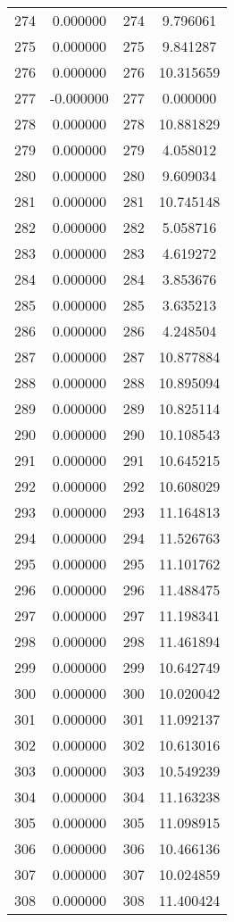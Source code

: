 \documentclass[12pt]{article}
\begin{document}
\begin{longtable}{@{}cccc@{}}
274 & 0.000000 & 274 & 9.796061 \\
275 & 0.000000 & 275 & 9.841287 \\
276 & 0.000000 & 276 & 10.315659 \\
277 & -0.000000 & 277 & 0.000000 \\
278 & 0.000000 & 278 & 10.881829 \\
279 & 0.000000 & 279 & 4.058012 \\
280 & 0.000000 & 280 & 9.609034 \\
281 & 0.000000 & 281 & 10.745148 \\
282 & 0.000000 & 282 & 5.058716 \\
283 & 0.000000 & 283 & 4.619272 \\
284 & 0.000000 & 284 & 3.853676 \\
285 & 0.000000 & 285 & 3.635213 \\
286 & 0.000000 & 286 & 4.248504 \\
287 & 0.000000 & 287 & 10.877884 \\
288 & 0.000000 & 288 & 10.895094 \\
289 & 0.000000 & 289 & 10.825114 \\
290 & 0.000000 & 290 & 10.108543 \\
291 & 0.000000 & 291 & 10.645215 \\
292 & 0.000000 & 292 & 10.608029 \\
293 & 0.000000 & 293 & 11.164813 \\
294 & 0.000000 & 294 & 11.526763 \\
295 & 0.000000 & 295 & 11.101762 \\
296 & 0.000000 & 296 & 11.488475 \\
297 & 0.000000 & 297 & 11.198341 \\
298 & 0.000000 & 298 & 11.461894 \\
299 & 0.000000 & 299 & 10.642749 \\
300 & 0.000000 & 300 & 10.020042 \\
301 & 0.000000 & 301 & 11.092137 \\
302 & 0.000000 & 302 & 10.613016 \\
303 & 0.000000 & 303 & 10.549239 \\
304 & 0.000000 & 304 & 11.163238 \\
305 & 0.000000 & 305 & 11.098915 \\
306 & 0.000000 & 306 & 10.466136 \\
307 & 0.000000 & 307 & 10.024859 \\
308 & 0.000000 & 308 & 11.400424 \\

\end{longtable}
\end{document}
